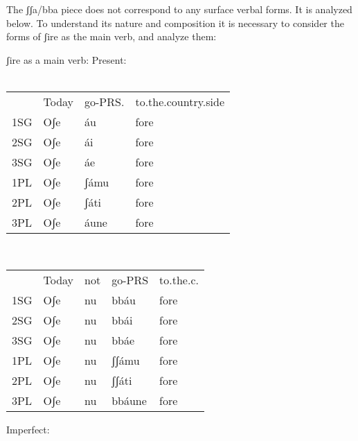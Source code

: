 \documentclass[output=paper]{langscibook}
\begin{document}
    \z
\z

The ʃʃa/bba piece does not correspond to any surface verbal forms.  It is analyzed below. To understand its nature and composition it is necessary to consider the forms of ʃire as the main verb, and analyze them:

\ea \label{ac24}ʃire as a main verb:
    \ea \label{ac24a}Present:\\
       \ea\label{ac24ai}~\\
            \begin{table}[htb]
            \begin{tabular}{llll    }
              & Today & go-PRS. & to.the.country.side          \\
            1SG & Oʃe   & áu      & fore                          \\
            2SG & Oʃe   & ái      & fore                         \\
            3SG & Oʃe   & áe      & fore                         \\
            1PL & Oʃe   & ʃámu    & fore                         \\
            2PL & Oʃe   & ʃáti    & fore                         \\
            3PL & Oʃe   & áune    & fore                      \\
            \end{tabular}
            \end{table}
        \ex\label{ac24aii}~\\
        \begin{table}[htb]
        \begin{tabular}{lllll}
         & Today & not     & go-PRS              & to.the.c. \\
        1SG & Oʃe   & nu      & bbáu                & fore      \\
        2SG & Oʃe   & nu      & bbái                & fore      \\
        3SG & Oʃe   & nu      & bbáe                & fore      \\
        1PL & Oʃe   & nu      & ʃʃámu               & fore      \\
        2PL & Oʃe   & nu      & ʃʃáti               & fore      \\
        3PL & Oʃe   & nu      & bbáune              & fore     
        \end{tabular}
        \end{table}
        \z  
    \ex \label{ac24b}Imperfect:\\
\end{document}
